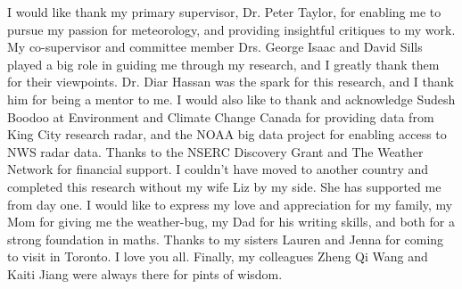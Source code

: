 I would like thank my primary supervisor, Dr. Peter Taylor, for enabling me to pursue my passion for meteorology, and providing insightful critiques to my
work. My co-supervisor and committee member Drs. George Isaac and David Sills played a big role in guiding me through my research, and I greatly thank them for 
their viewpoints. Dr. Diar Hassan was the spark for this research, and I thank him for being a mentor to me. I would also like to thank and acknowledge Sudesh
Boodoo at Environment and Climate Change Canada for providing data from King City research radar, and the NOAA big data project for enabling access to NWS
radar data. Thanks to the NSERC Discovery Grant and The Weather Network for financial support. I couldn't have moved to another country and completed this
research without my wife Liz by my side. She has supported me from day one. I would like to express my love and appreciation for my family, my Mom for giving
me the weather-bug, my Dad for his writing skills, and both for a strong foundation in maths. Thanks to my sisters Lauren and Jenna for coming to visit in
Toronto. I love you all. Finally, my colleagues Zheng Qi Wang and Kaiti Jiang were always there for pints of wisdom.